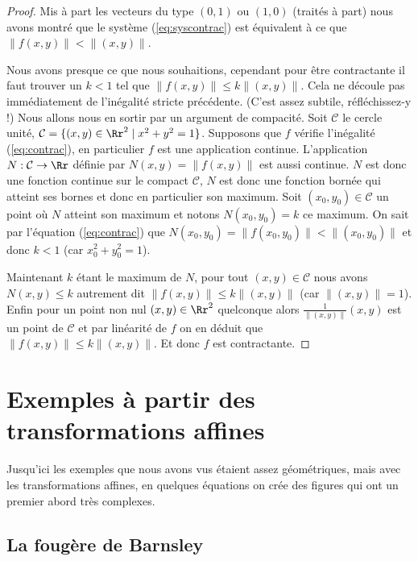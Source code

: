 \documentclass[11pt,class=report,crop=false]{standalone}
\begin{document}
\begin{proof}
Mis à part les vecteurs du type $(0,1)$ ou $(1,0)$ (traités à part) nous avons montré que
le système (\ref{eq:syscontrac}) est équivalent à ce que $\|f(x,y)\| < \|(x,y) \|$.

\bigskip 

Nous avons presque ce que nous souhaitions, cependant pour être contractante il faut trouver un $k<1$
tel que $\|f(x,y)\| \le k\|(x,y) \|$. Cela ne découle pas immédiatement de l'inégalité stricte précédente.
(C'est assez subtile, réfléchissez-y !)
Nous allons nous en sortir par un argument de compacité. 
Soit $\mathcal{C}$ le cercle unité, $\mathcal{C} = \{ (x,y)\in \Rr^2 \mid x^2+y^2=1 \}$.
Supposons que $f$ vérifie l'inégalité
(\ref{eq:contrac}), en particulier $f$ est une application continue.
L'application $N :\mathcal{C} \to \Rr$ définie par 
$N(x,y) = {\|f(x,y)\|}$ est aussi continue. $N$ est donc une fonction continue sur le compact $\mathcal{C}$,
$N$ est donc une fonction bornée qui atteint ses bornes et donc en particulier son maximum.
Soit $(x_0,y_0) \in \mathcal{C}$ un point où $N$ atteint son maximum et notons
$N(x_0,y_0)=k$ ce maximum. On sait par l'équation (\ref{eq:contrac}) que
$N(x_0,y_0)=\|f(x_0,y_0)\| < \|(x_0,y_0)\|$ et donc $k< 1$ (car $x_0^2+y_0^2=1$).

Maintenant $k$ étant le maximum de $N$, pour tout $(x,y) \in \mathcal{C}$ nous avons
$N(x,y) \le k$ autrement dit $\|f(x,y)\| \le k\|(x,y) \|$ (car $\|(x,y)\|=1$).
Enfin pour un point non nul $(x,y)\in\Rr^2$ quelconque alors
$\frac{1}{\|(x,y)\|}(x,y)$ est un point de $\mathcal{C}$ et par linéarité de $f$ on en déduit que
$\|f(x,y)\| \le k\|(x,y) \|$. Et donc $f$ est contractante.
\end{proof}

\section{Exemples à partir des transformations affines}

Jusqu'ici les exemples que nous avons vus étaient assez géométriques, mais
avec les transformations affines, en quelques équations on crée des figures
qui ont un premier abord très complexes.

\subsection{La fougère de Barnsley}
\end{document}
